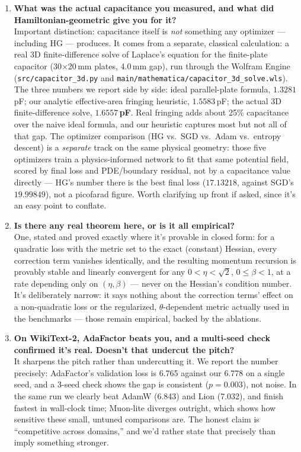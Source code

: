 \documentclass[11pt]{article}
\begin{document}
\begin{enumerate}[leftmargin=1.4em, itemsep=0.9em]
\item \textbf{What was the actual capacitance you measured, and what did Hamiltonian-geometric give you for it?}\\
Important distinction: capacitance itself is \emph{not} something any optimizer --- including
HG --- produces. It comes from a separate, classical calculation: a real 3D finite-difference
solve of Laplace's equation for the finite-plate capacitor (30$\times$20\,mm plates, 4.0\,mm gap),
run through the Wolfram Engine (\texttt{src/capacitor\_3d.py} and
\texttt{main/mathematica/capacitor\_3d\_solve.wls}). The three numbers we report side by side:
ideal parallel-plate formula, $1.3281$\,pF; our analytic effective-area fringing heuristic,
$1.5583$\,pF; the actual 3D finite-difference solve, $\mathbf{1.6557}$\,\textbf{pF}. Real fringing
adds about 25\% capacitance over the naive ideal formula, and our heuristic captures most but not
all of that gap. The optimizer comparison (HG vs.\ SGD vs.\ Adam vs.\ entropy descent) is a
\emph{separate} track on the same physical geometry: those five optimizers train a
physics-informed network to fit that same potential field, scored by final loss and PDE/boundary
residual, not by a capacitance value directly --- HG's number there is the best final loss
($17.13218$, against SGD's $19.99849$), not a picofarad figure. Worth clarifying up front if
asked, since it's an easy point to conflate.

\item \textbf{Is there any real theorem here, or is it all empirical?}\\
One, stated and proved exactly where it's provable in closed form: for a quadratic loss with the
metric set to the exact (constant) Hessian, every correction term vanishes identically, and the
resulting momentum recursion is provably stable and linearly convergent for any $0<\eta<\sqrt2$,
$0\le\beta<1$, at a rate depending only on $(\eta,\beta)$ --- never on the Hessian's condition
number. It's deliberately narrow: it says nothing about the correction terms' effect on a
non-quadratic loss or the regularized, $\theta$-dependent metric actually used in the benchmarks
--- those remain empirical, backed by the ablations.

\item \textbf{On WikiText-2, AdaFactor beats you, and a multi-seed check confirmed it's real. Doesn't that undercut the pitch?}\\
It sharpens the pitch rather than undercutting it. We report the number precisely: AdaFactor's
validation loss is 6.765 against our 6.778 on a single seed, and a 3-seed check shows the gap is
consistent ($p=0.003$), not noise. In the same run we clearly beat AdamW (6.843) and Lion (7.032),
and finish fastest in wall-clock time; Muon-lite diverges outright, which shows how sensitive
these small, untuned comparisons are. The honest claim is ``competitive across domains,'' and we'd
rather state that precisely than imply something stronger.


\end{enumerate}
\end{document}
